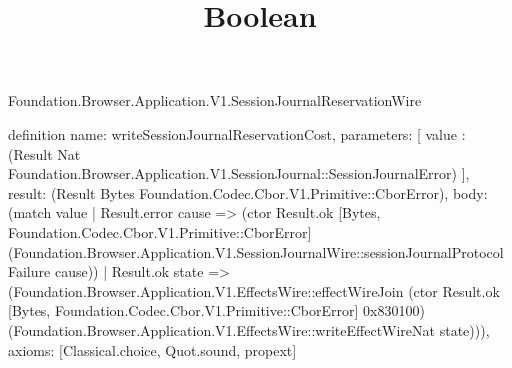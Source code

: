 \begin{lexlean}{Foundation.Browser.Application.V1.SessionJournalReservationWire}
\title{Boolean}
\begin{semanticmodule}
definition{
  name: writeSessionJournalReservationCost,
  parameters: [
    value : (Result Nat Foundation.Browser.Application.V1.SessionJournal::SessionJournalError)
  ],
  result: (Result Bytes Foundation.Codec.Cbor.V1.Primitive::CborError),
  body: (match value
    | Result.error cause => (ctor Result.ok [Bytes, Foundation.Codec.Cbor.V1.Primitive::CborError] (Foundation.Browser.Application.V1.SessionJournalWire::sessionJournalProtocolFailure cause))
    | Result.ok state => (Foundation.Browser.Application.V1.EffectsWire::effectWireJoin (ctor Result.ok [Bytes, Foundation.Codec.Cbor.V1.Primitive::CborError] 0x830100) (Foundation.Browser.Application.V1.EffectsWire::writeEffectWireNat state))),
  axioms: [Classical.choice, Quot.sound, propext]
}


\end{semanticmodule}
\end{lexlean}
